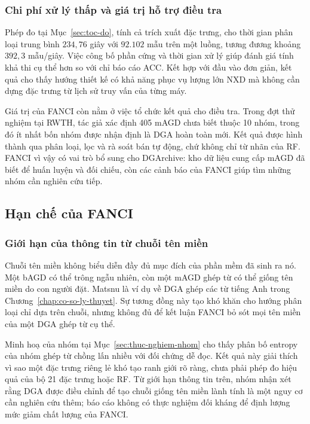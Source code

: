 \subsubsection{Chi phí xử lý thấp và giá trị hỗ trợ điều tra}

Phép đo tại Mục~\ref{sec:toc-do}, tính cả trích xuất đặc trưng, cho thời gian phân loại trung bình $234{,}76$ giây với $92.102$ mẫu trên một luồng, tương đương khoảng $392{,}3$ mẫu/giây. Việc công bố phần cứng và thời gian xử lý giúp đánh giá tính khả thi cụ thể hơn so với chỉ báo cáo ACC. Kết hợp với đầu vào đơn giản, kết quả cho thấy hướng thiết kế có khả năng phục vụ lượng lớn NXD mà không cần dựng đặc trưng từ lịch sử truy vấn của từng máy.

Giá trị của FANCI còn nằm ở việc tổ chức kết quả cho điều tra. Trong đợt thử nghiệm tại RWTH, tác giả xác định 405 mAGD chưa biết thuộc 10 nhóm, trong đó ít nhất bốn nhóm được nhận định là DGA hoàn toàn mới. Kết quả được hình thành qua phân loại, lọc và rà soát bán tự động, chứ không chỉ từ nhãn của RF. FANCI vì vậy có vai trò bổ sung cho DGArchive: kho dữ liệu cung cấp mAGD đã biết để huấn luyện và đối chiếu, còn các cảnh báo của FANCI giúp tìm những nhóm cần nghiên cứu tiếp.

\subsection{Hạn chế của FANCI}\label{sec:han-che}

\subsubsection{Giới hạn của thông tin từ chuỗi tên miền}

Chuỗi tên miền không biểu diễn đầy đủ mục đích của phần mềm đã sinh ra nó. Một bAGD có thể trông ngẫu nhiên, còn một mAGD ghép từ có thể giống tên miền do con người đặt. Matsnu là ví dụ về DGA ghép các từ tiếng Anh trong Chương~\ref{chap:co-so-ly-thuyet}. Sự tương đồng này tạo khó khăn cho hướng phân loại chỉ dựa trên chuỗi, nhưng không đủ để kết luận FANCI bỏ sót mọi tên miền của một DGA ghép từ cụ thể.

Minh hoạ của nhóm tại Mục~\ref{sec:thuc-nghiem-nhom} cho thấy phân bố entropy của nhóm ghép từ chồng lấn nhiều với đối chứng dễ đọc. Kết quả này giải thích vì sao một đặc trưng riêng lẻ khó tạo ranh giới rõ ràng, chưa phải phép đo hiệu quả của bộ 21 đặc trưng hoặc RF. Từ giới hạn thông tin trên, nhóm nhận xét rằng DGA được điều chỉnh để tạo chuỗi giống tên miền lành tính là một nguy cơ cần nghiên cứu thêm; báo cáo không có thực nghiệm đối kháng để định lượng mức giảm chất lượng của FANCI.

